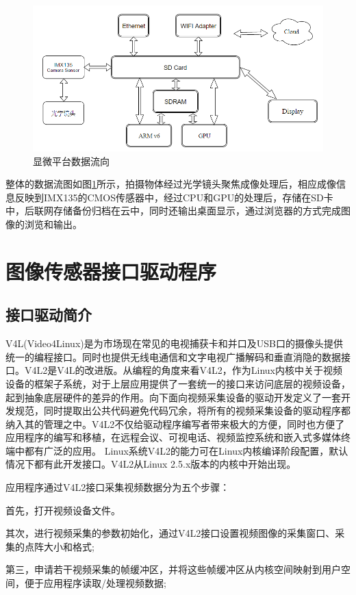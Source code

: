 \begin{figure}[h]
\centering
\includegraphics[width=0.7\linewidth]{Figure/rasp_arch_1}
\caption{显微平台数据流向}
\label{fig:rasp_arch_1}
\end{figure}


整体的数据流图如图\ref{fig:rasp_arch_1}所示，拍摄物体经过光学镜头聚焦成像处理后，相应成像信息反映到IMX135的CMOS传感器中，经过CPU和GPU的处理后，存储在SD卡中，后联网存储备份归档在云中，同时还输出桌面显示，通过浏览器的方式完成图像的浏览和输出。


\section{图像传感器接口驱动程序}
\subsection{接口驱动简介}
V4L(Video4Linux)是为市场现在常见的电视捕获卡和并口及USB口的摄像头提供统一的编程接口。同时也提供无线电通信和文字电视广播解码和垂直消隐的数据接口。V4L2是V4L的改进版。从编程的角度来看V4L2，作为Linux内核中关于视频设备的框架子系统，对于上层应用提供了一套统一的接口来访问底层的视频设备，起到抽象底层硬件的差异的作用。向下面向视频采集设备的驱动开发定义了一套开发规范，同时提取出公共代码避免代码冗余，将所有的视频采集设备的驱动程序都纳入其的管理之中。V4L2不仅给驱动程序编写者带来极大的方便，同时也方便了应用程序的编写和移植，在远程会议、可视电话、视频监控系统和嵌入式多媒体终端中都有广泛的应用\cite{v4l2embedded}。
Linux系统V4L2的能力可在Linux内核编译阶段配置，默认情况下都有此开发接口。V4L2从Linux 2.5.x版本的内核中开始出现。

应用程序通过V4L2接口采集视频数据分为五个步骤：

首先，打开视频设备文件。

其次，进行视频采集的参数初始化，通过V4L2接口设置视频图像的采集窗口、采集的点阵大小和格式;

第三，申请若干视频采集的帧缓冲区，并将这些帧缓冲区从内核空间映射到用户空间，便于应用程序读取/处理视频数据;

